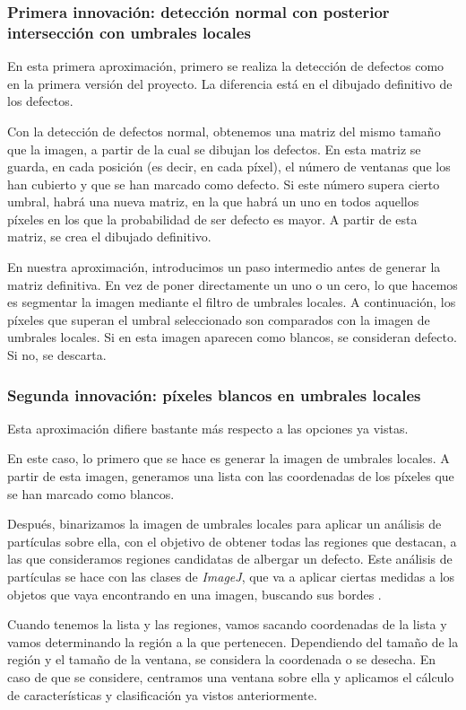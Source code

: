 \subsubsection{Primera innovación: detección normal con posterior intersección con umbrales locales}
En esta primera aproximación, primero se realiza la detección de defectos como en la primera versión del proyecto. La diferencia está en el dibujado definitivo de los defectos.

Con la detección de defectos normal, obtenemos una matriz del mismo tamaño que la imagen, a partir de la cual se dibujan los defectos. En esta matriz se guarda, en cada posición (es decir, en cada píxel), el número de ventanas que los han cubierto y que se han marcado como defecto. Si este número supera cierto umbral, habrá una nueva matriz, en la que habrá un uno en todos aquellos píxeles en los que la probabilidad de ser defecto es mayor. A partir de esta matriz, se crea el dibujado definitivo.

En nuestra aproximación, introducimos un paso intermedio antes de generar la matriz definitiva. En vez de poner directamente un uno o un cero, lo que hacemos es segmentar la imagen mediante el filtro de umbrales locales. A continuación, los píxeles que superan el umbral seleccionado son comparados con la imagen de umbrales locales. Si en esta imagen aparecen como blancos, se consideran defecto. Si no, se descarta.

\subsubsection{Segunda innovación: píxeles blancos en umbrales locales}
Esta aproximación difiere bastante más respecto a las opciones ya vistas.

En este caso, lo primero que se hace es generar la imagen de umbrales locales. A partir de esta imagen, generamos una lista con las coordenadas de los píxeles que se han marcado como blancos.

Después, binarizamos la imagen de umbrales locales para aplicar un análisis de partículas sobre ella, con el objetivo de obtener todas las regiones que destacan, a las que consideramos regiones candidatas de albergar un defecto. Este análisis de partículas se hace con las clases de \emph{ImageJ}, que va a aplicar ciertas medidas a los objetos que vaya encontrando en una imagen, buscando sus bordes \cite{particleij}.

Cuando tenemos la lista y las regiones, vamos sacando coordenadas de la lista y vamos determinando la región a la que pertenecen. Dependiendo del tamaño de la región y el tamaño de la ventana, se considera la coordenada o se desecha. En caso de que se considere, centramos una ventana sobre ella y aplicamos el cálculo de características y clasificación ya vistos anteriormente.

